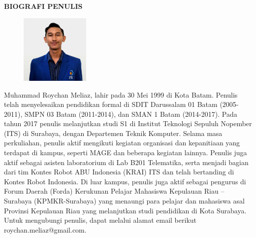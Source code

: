 \begin{center}
  \Large
  \textbf{BIOGRAFI PENULIS}
\end{center}


\vspace{2ex}

\begin{figure}
  \centering
  \vspace{-3ex}
  \includegraphics[width=0.3\textwidth]{images/roy.jpg}
  \vspace{-4ex}
\end{figure}

Muhammad Roychan Meliaz, lahir pada 30 Mei 1999 di Kota Batam. Penulis telah menyelesaikan pendidikan formal di SDIT Darussalam 01 Batam (2005-2011), SMPN 03 Batam (2011-2014), dan SMAN 1 Batam (2014-2017). Pada tahun 2017 penulis melanjutkan studi S1 di Institut Teknologi Sepuluh Nopember (ITS) di Surabaya, dengan Departemen Teknik Komputer. Selama masa perkuliahan, penulis aktif mengikuti kegiatan organisasi dan kepanitiaan yang terdapat di kampus, seperti MAGE dan beberapa kegiatan lainnya. Penulis juga aktif sebagai asisten laboratorium di Lab B201 Telematika, serta menjadi bagian dari tim Kontes Robot ABU Indonesia (KRAI) ITS dan telah bertanding di Kontes Robot Indonesia. Di luar kampus, penulis juga aktif
sebagai pengurus di Forum Daerah (Forda) Kerukunan Pelajar Mahasiswa Kepulauan Riau – Surabaya (KPMKR-Surabaya) yang menaungi para pelajar dan mahasiswa asal Provinsi Kepulauan Riau yang melanjutkan studi pendidikan di Kota Surabaya. Untuk mengubungi penulis, dapat melalui alamat email berikut roychan.meliaz@gmail.com. 


